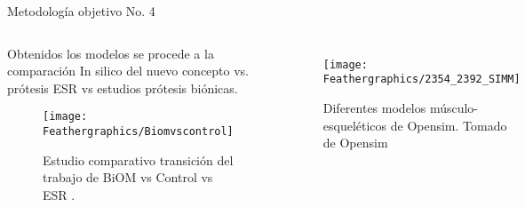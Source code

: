 \documentclass[10pt]{beamer}
\begin{document}
\begin{frame}{Metodología objetivo No. 4}

\begin{columns}[t]


\column{65 mm}
\begin{block}{}

{\scriptsize{}Obtenidos los modelos se procede a la comparación In
silico del nuevo concepto vs. prótesis ESR vs estudios prótesis biónicas.}{\scriptsize \par}

\begin{figure}
\begin{centering}
\texttt{[image: Feathergraphics/Biomvscontrol]}
\par\end{centering}
\caption{Estudio comparativo transición del trabajo de BiOM vs Control vs ESR
\cite{Esposito2015}.}

\end{figure}
\end{block}

\column{60 mm}

\begin{figure}
\begin{centering}
\texttt{[image: Feathergraphics/2354\_2392\_SIMM]}
\par\end{centering}
\caption{Diferentes modelos músculo-esqueléticos de Opensim. Tomado de Opensim}
\end{figure}

\end{columns}

\end{frame}
\end{document}
